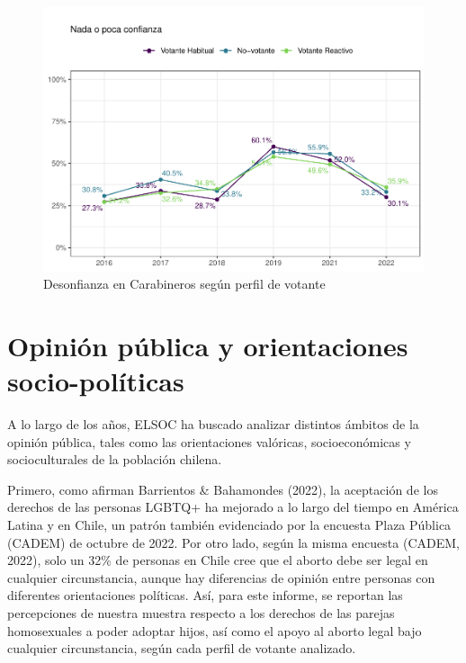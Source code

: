 \documentclass[
  12pt,
]{book}
\begin{document}
\begin{figure}

{\centering \includegraphics{reporte-elsoc_files/figure-latex/graf-carab-1} 

}

\caption{Desonfianza en Carabineros según perfil de votante}\label{fig:graf-carab}
\end{figure}

\hypertarget{opiniuxf3n-puxfablica-y-orientaciones-socio-poluxedticas}{%
\section{Opinión pública y orientaciones socio-políticas}\label{opiniuxf3n-puxfablica-y-orientaciones-socio-poluxedticas}}

A lo largo de los años, ELSOC ha buscado analizar distintos ámbitos de la opinión pública, tales como las orientaciones valóricas, socioeconómicas y socioculturales de la población chilena.

Primero, como afirman Barrientos \& Bahamondes (2022), la aceptación de los derechos de las personas LGBTQ+ ha mejorado a lo largo del tiempo en América Latina y en Chile, un patrón también evidenciado por la encuesta Plaza Pública (CADEM) de octubre de 2022. Por otro lado, según la misma encuesta (CADEM, 2022), solo un 32\% de personas en Chile cree que el aborto debe ser legal en cualquier circunstancia, aunque hay diferencias de opinión entre personas con diferentes orientaciones políticas. Así, para este informe, se reportan las percepciones de nuestra muestra respecto a los derechos de las parejas homosexuales a poder adoptar hijos, así como el apoyo al aborto legal bajo cualquier circunstancia, según cada perfil de votante analizado.
\end{document}
